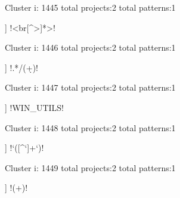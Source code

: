Cluster i: 1445
total projects:2
total patterns:1
\begin{multicols}{1}
\begin{description}[noitemsep,topsep=0pt]
\item [[2] ] \cverb!<br[^>]*>!
\end{description}
\end{multicols}







Cluster i: 1446
total projects:2
total patterns:1
\begin{multicols}{1}
\begin{description}[noitemsep,topsep=0pt]
\item [[2] ] \cverb!.*/(\d+)!
\end{description}
\end{multicols}







Cluster i: 1447
total projects:2
total patterns:1
\begin{multicols}{1}
\begin{description}[noitemsep,topsep=0pt]
\item [[2] ] \cverb!WIN_UTILS!
\end{description}
\end{multicols}







Cluster i: 1448
total projects:2
total patterns:1
\begin{multicols}{1}
\begin{description}[noitemsep,topsep=0pt]
\item [[2] ] \cverb!`([^`]+`)!
\end{description}
\end{multicols}







Cluster i: 1449
total projects:2
total patterns:1
\begin{multicols}{1}
\begin{description}[noitemsep,topsep=0pt]
\item [[2] ] \cverb!\+(\w+)!
\end{description}
\end{multicols}







